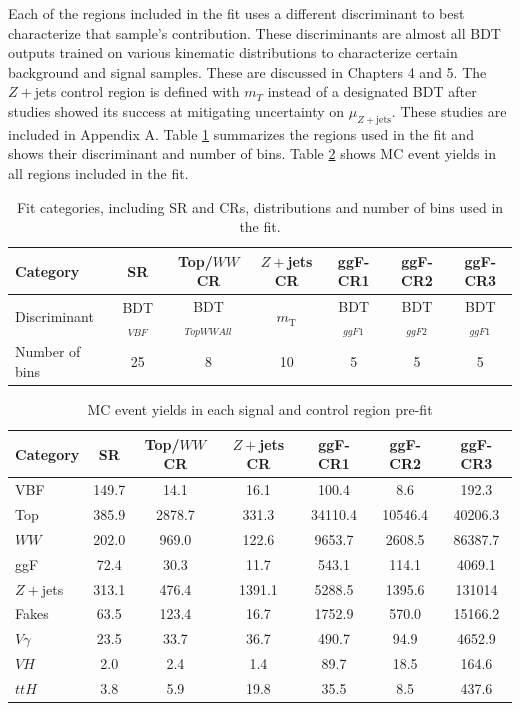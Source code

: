Each of the regions included in the fit uses a different discriminant to best characterize that sample's contribution. These discriminants are almost all BDT outputs trained on various kinematic distributions to characterize certain background and signal samples. These are discussed in Chapters 4 and 5. The $Z+$jets control region is defined with $m_T$ instead of a designated BDT after studies showed its success at mitigating uncertainty on $\mu_{Z+\text{jets}}$. These studies are included in Appendix A. Table \ref{tab:fitinputs} summarizes the regions used in the fit and shows their discriminant and number of bins. Table \ref{tab:cryields} shows MC event yields in all regions included in the fit. 
\begin{table}[!h]
  \begin{center}
    \begin{tabular}{l|cccccc}
       Category		& SR 	& Top/$WW$ CR 	& $Z+$jets CR 		& ggF-CR1 		& ggF-CR2 	& ggF-CR3 \\
      \hline
      Discriminant	& BDT$_{VBF}$ &  BDT$_{TopWWAll}$	& $m_{\text{T}}$	& BDT$_{ggF1}$	& BDT$_{ggF2}$ & BDT$_{ggF1}$ \\
      Number of bins    &  25 	      & 8 	& 10 			& 5 			& 5 		& 5  \\	
    \end{tabular}
    \caption{Fit categories, including SR and CRs, distributions and number of bins used in the fit.}
    \label{tab:fitinputs}
  \end{center}
\end{table}

\begin{table}[!h]
  \begin{center}
    \begin{tabular}{l|cccccc}
      Category         & SR    & Top/$WW$ CR   & $Z+$jets CR           & ggF-CR1               & ggF-CR2       & ggF-CR3 \\
      \hline
      VBF      & 149.7 & 14.1 & 16.1 & 100.4 & 8.6 & 192.3 \\
      Top    &  385.9 & 2878.7 & 331.3 & 34110.4 & 10546.4 & 40206.3 \\
      $WW$ & 202.0 & 969.0 & 122.6 & 9653.7 & 2608.5 & 86387.7 \\
      ggF & 72.4 & 30.3 & 11.7 & 543.1 & 114.1 & 4069.1 \\
      $Z+$jets & 313.1 & 476.4 & 1391.1 & 5288.5 & 1395.6 & 131014 \\
      Fakes & 63.5 & 123.4 & 16.7 & 1752.9 & 570.0 & 15166.2 \\
      $V\gamma$ & 23.5 & 33.7 & 36.7 & 490.7 & 94.9 & 4652.9 \\
      $VH$ & 2.0 & 2.4 & 1.4 & 89.7 & 18.5 & 164.6 \\
      $ttH$ &  3.8 &  5.9 &  19.8 & 35.5 & 8.5 & 437.6 \\
      \hline
    \end{tabular}
    \caption{MC event yields in each signal and control region pre-fit}
    \label{tab:cryields}
  \end{center}
\end{table}

